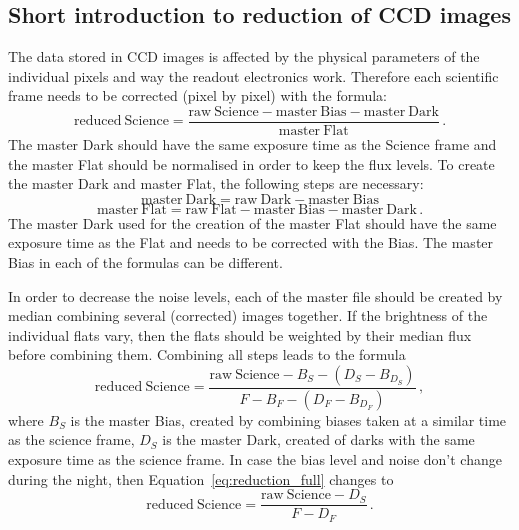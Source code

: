 \documentclass[10pt,a4paper]{article}
\begin{document}
\subsection{Short introduction to reduction of CCD images}

The data stored in CCD images is affected by the physical parameters of the individual pixels and way the readout electronics work. Therefore each scientific frame needs to be corrected (pixel by pixel) with the formula:
\begin{equation}
  \mathrm{reduced\ Science} = \frac{\mathrm{raw\ Science} - \mathrm{master\ Bias} - \mathrm{master\ Dark}}{\mathrm{master\ Flat}}\,.
\end{equation}
The master Dark should have the same exposure time as the Science frame and the master Flat should be normalised in order to keep the flux levels. To create the master Dark and master Flat, the following steps are necessary:
\begin{equation}
  \mathrm{master\ Dark} = \mathrm{raw\ Dark} - \mathrm{master\ Bias}
\end{equation}
\begin{equation}
  \mathrm{master\ Flat} = \mathrm{raw\ Flat} - \mathrm{master\ Bias} - \mathrm{master\ Dark}\,.
\end{equation}
The master Dark used for the creation of the master Flat should have the same exposure time as the Flat and needs to be corrected with the Bias. The master Bias in each of the formulas can be different.

In order to decrease the noise levels, each of the master file should be created by median combining several (corrected) images together. If the brightness of the individual flats vary, then the flats should be weighted by their median flux before combining them. Combining all steps leads to the formula
\begin{equation}
  \label{eq:reduction_full}
  \mathrm{reduced\ Science} = \frac{\mathrm{raw\ Science} - B_S - (D_S - B_{D_S})}{F - B_F - (D_F - B_{D_F})}\,,
\end{equation}
where $B_S$ is the master Bias, created by combining biases taken at a similar time as the science frame, $D_S$ is the master Dark, created of darks with the same exposure time as the science frame. In case the bias level and noise don't change during the night, then Equation~\ref{eq:reduction_full} changes to
\begin{equation}
  \mathrm{reduced\ Science} = \frac{\mathrm{raw\ Science} - D_S}{F - D_F}\,.
\end{equation}
\end{document}
